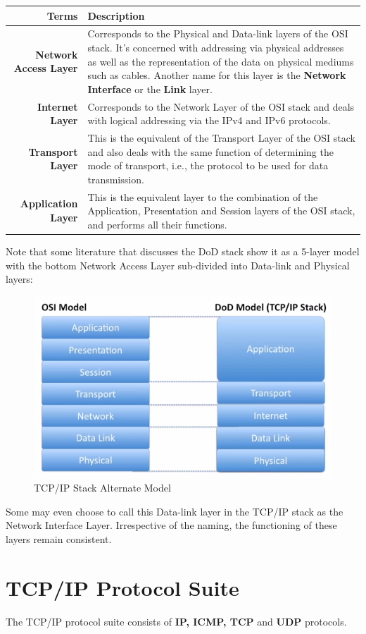 \noindent
\begin{tabular}{rM{0.69}}
	\toprule
	\textbf{Terms} &\textbf{Description} \\
	\midrule
	\textbf{Network Access Layer}	&Corresponds to the Physical and Data-link layers of the OSI stack. It's concerned with addressing via physical addresses as well as the representation of the data on physical mediums such as cables. Another name for this layer is the \textbf{Network Interface} or the \textbf{Link} layer.\\
	\midrule
	\textbf{Internet Layer}	&Corresponds to the Network Layer of the OSI stack and deals with logical addressing via the IPv4 and IPv6 protocols.\\
	\midrule
	\textbf{Transport Layer}	&This is the equivalent of the Transport Layer of the OSI stack and also deals with the same function of determining the mode of transport, i.e., the protocol to be used for data transmission.\\
	\midrule
	\textbf{Application Layer}	&This is the equivalent layer to the combination of the Application, Presentation and Session layers of the OSI stack, and performs all their functions. \\
	\bottomrule
\end{tabular}

\noindent
Note that some literature that discusses the DoD stack show it as a 5-layer model with the bottom Network Access Layer sub-divided into Data-link and Physical layers:

\begin{figure}[H]
	\centering
	\includegraphics[width=0.7\linewidth]{"Mod1/chapters/1.1.c DoD Alternate Model"}
	\caption{TCP/IP Stack Alternate Model}
	\label{fig:1 TCP/IP Stack Alternate Model}
\end{figure}

\noindent
Some may even choose to call this Data-link layer in the TCP/IP stack as the Network Interface Layer. Irrespective of the naming, the functioning of these layers remain consistent. 

\section{TCP/IP Protocol Suite}
The TCP/IP protocol suite consists of \textbf{IP, ICMP, TCP} and \textbf{UDP} protocols. 
 